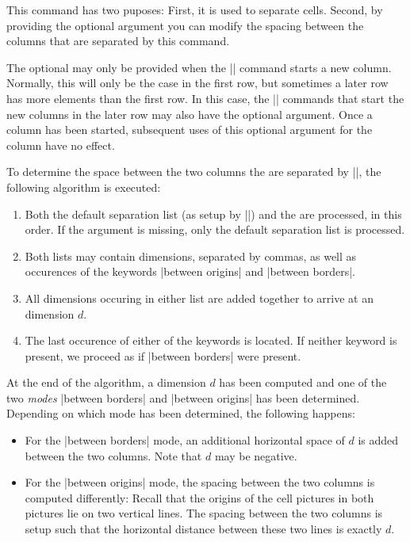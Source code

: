 \begin{command}{\pgfmatrixnextcell{}}
  This command has two puposes: First, it is used to separate
  cells. Second, by providing the optional argument  you can modify the spacing between the columns that are
  separated by this command.

  The optional  may only be provided when
  the |\pgfmatrixnextcell| command starts a new column. Normally, this
  will only be the case in the first row, but sometimes a later row
  has more elements than the first row. In this case, the
  |\pgfmatrixnextcell| commands that start the new columns in the
  later row may also have the optional argument. Once a column has
  been started, subsequent uses of this optional argument for the
  column have no effect.

  To determine the space between the two columns the are separated by
  |\pgfmatrixnextcell|, the following algorithm is executed:
  \begin{enumerate}
  \item Both the default separation list (as setup by
    |\pgfsetmatrixcolumnsep|) and the  are
    processed, in this order. If the 
    argument is missing, only the default separation list is
    processed.
  \item Both lists may contain dimensions, separated by commas, as
    well as occurences of the keywords |between origins| and
    |between borders|.
  \item All dimensions occuring in either list are added together to
    arrive at an dimension $d$.
  \item The last occurence of either of the keywords is located. If
    neither keyword is present, we proceed as if |between borders|
    were present.
  \end{enumerate}
  At the end of the algorithm, a dimension $d$ has been computed and
  one of the two \emph{modes} |between borders| and |between origins|
  has been determined. Depending on which mode has been determined,
  the following happens:
  \begin{itemize}
  \item For the |between borders| mode, an additional horizontal space
    of $d$ is added between the two columns. Note that $d$ may be
    negative.
  \item For the |between origins| mode, the spacing between the two
    columns is computed differently: Recall that the origins of the
    cell pictures in both pictures lie on two vertical lines. The
    spacing between the two columns is setup such that the horizontal
    distance between these two lines is exactly $d$.


\end{itemize}
\end{command}
